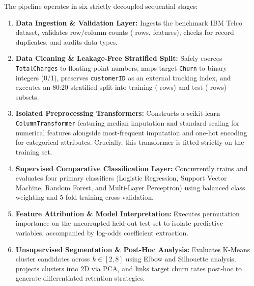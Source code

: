 The pipeline operates in six strictly decoupled sequential stages:
\begin{enumerate}
    \item \textbf{Data Ingestion \& Validation Layer:} Ingests the benchmark IBM Telco dataset, validates row/column counts (\datasetTotalRows{} rows, \datasetTotalCols{} features), checks for record duplicates, and audits data types.
    \item \textbf{Data Cleaning \& Leakage-Free Stratified Split:} Safely coerces \texttt{TotalCharges} to floating-point numbers, maps target \texttt{Churn} to binary integers (0/1), preserves \texttt{customerID} as an external tracking index, and executes an 80:20 stratified split into training (\datasetTrainCount{} rows) and test (\datasetTestCount{} rows) subsets.
    \item \textbf{Isolated Preprocessing Transformers:} Constructs a scikit-learn \texttt{ColumnTransformer} featuring median imputation and standard scaling for numerical features alongside most-frequent imputation and one-hot encoding for categorical attributes. Crucially, this transformer is fitted strictly on the training set.
    \item \textbf{Supervised Comparative Classification Layer:} Concurrently trains and evaluates four primary classifiers (Logistic Regression, Support Vector Machine, Random Forest, and Multi-Layer Perceptron) using balanced class weighting and 5-fold training cross-validation.
    \item \textbf{Feature Attribution \& Model Interpretation:} Executes permutation importance on the uncorrupted held-out test set to isolate predictive variables, accompanied by log-odds coefficient extraction.
    \item \textbf{Unsupervised Segmentation \& Post-Hoc Analysis:} Evaluates K-Means cluster candidates across $k \in [2, 8]$ using Elbow and Silhouette analysis, projects clusters into 2D via PCA, and links target churn rates post-hoc to generate differentiated retention strategies.
\end{enumerate}

